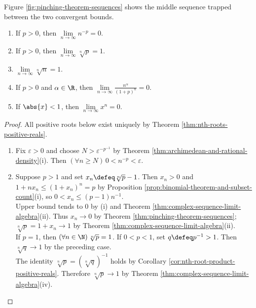 \begin{illustrationfigure}[H]
  \centering
  
  \caption{With $a_n\leq s_n\leq b_n$ and $a_n,b_n\to s$, the middle sequence also tends to $s$.}
  \label{fig:pinching-theorem-sequences}
\end{illustrationfigure}
Figure \ref{fig:pinching-theorem-sequences} shows the middle sequence trapped between the two convergent bounds.

\begin{theorem} \label{thm:special-sequence-limits} 
\begin{enumerate}[label=(\roman*)]
\setlength{\itemsep}{0pt}
\item If $p>0$, then $\lim\limits_{n\to\infty}n^{-p}=0$.
\item If $p>0$, then $\lim\limits_{n\to\infty}\sqrt[n]{p}=1$.
\item $\lim\limits_{n\to\infty}\sqrt[n]{n}=1$.
\item If $p>0$ and $\alpha\in\R$, then $\lim\limits_{n\to\infty}\frac{n^\alpha}{(1+p)^n}=0$.
\item If $\abs{x}<1$, then $\lim\limits_{n\to\infty}x^n=0$.
\end{enumerate}
\begin{proof} All positive roots below exist uniquely by Theorem \ref{thm:nth-roots-positive-reals}.
\begin{enumerate}[label=(\roman*)]
\setlength{\itemsep}{0pt}
\item Fix $\varepsilon>0$ and choose $N>\varepsilon^{-p^{-1}}$ by Theorem \ref{thm:archimedean-and-rational-density}(i). Then $(\forall n\geq N)\,0<n^{-p}<\varepsilon$.
\item Suppose $p>1$ and set $x_n\defeq\sqrt[n]{p}-1$. Then $x_n>0$ and $1+nx_n\leq(1+x_n)^n=p$ by Proposition \ref{prop:binomial-theorem-and-subset-count}(i), so $0<x_n\leq(p-1)n^{-1}$.\\
Upper bound tends to $0$ by (i) and Theorem \ref{thm:complex-sequence-limit-algebra}(ii). Thus $x_n\to0$ by Theorem \ref{thm:pinching-theorem-sequences}; $\sqrt[n]{p}=1+x_n\to1$ by Theorem \ref{thm:complex-sequence-limit-algebra}(ii).\\
If $p=1$, then $(\forall n\in\N)\,\sqrt[n]{p}=1$. If $0<p<1$, set $q\defeq p^{-1}>1$. Then $\sqrt[n]{q}\to1$ by the preceding case.\\
The identity $\sqrt[n]{p}=(\sqrt[n]{q})^{-1}$ holds by Corollary \ref{cor:nth-root-product-positive-reals}. Therefore $\sqrt[n]{p}\to1$ by Theorem \ref{thm:complex-sequence-limit-algebra}(iv).

\end{enumerate}
\end{proof}
\end{theorem}

